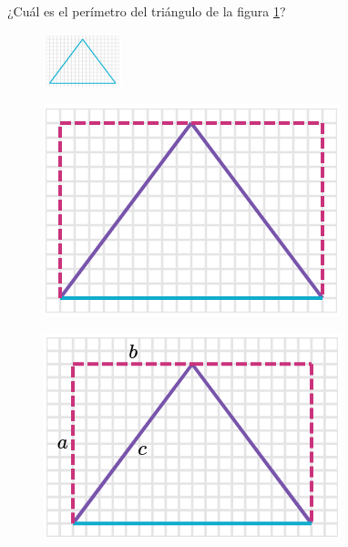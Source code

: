 
¿Cuál es el perímetro del triángulo de la figura \ref{fig:peri_isos_02}?

\begin{figure}[H]
    \centering
    \includegraphics[width=0.2\textwidth]{../images/peri_isos_02.png}
    \caption{}
    \label{fig:peri_isos_02}
\end{figure}
\begin{solutionbox}{16cm}
    \begin{minipage}{0.3\textwidth}
        \begin{figure}[H]
            \centering
            \includegraphics[width=0.6\linewidth]{../images/peri_isos_02a.png}
            \caption{}
            \label{fig:peri_isos_02a}
        \end{figure}
        \begin{figure}[H]
            \centering
            \includegraphics[width=0.6\linewidth]{../images/peri_isos_02b.png}
            \caption{}
            \label{fig:peri_isos_02b}

\end{figure}
\end{minipage}
\end{solutionbox}
